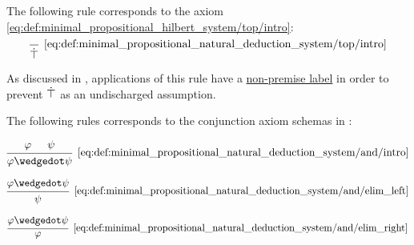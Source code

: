 \begin{definition}
\begin{thmenum}
     The following rule corresponds to the axiom \eqref{eq:def:minimal_propositional_hilbert_system/top/intro}:
    \begin{equation*}\taglabel[\( \top^+ \)]{eq:def:minimal_propositional_natural_deduction_system/top/intro}
      \begin{prooftree}
        \infer0[\ref{eq:def:minimal_propositional_natural_deduction_system/top/intro}]{ \syntop }
      \end{prooftree}
    \end{equation*}

    As discussed in , applications of this rule have a \hyperref[def:natural_deduction_proof_tree/premises]{non-premise label} in order to prevent \( \dot\top \) as an undischarged assumption.

     The following rules corresponds to the conjunction axiom schemas in :

    \begin{minipage}{0.3\textwidth}
      \begin{equation*}\taglabel[\( \wedge^+ \)]{eq:def:minimal_propositional_natural_deduction_system/and/intro}
        \begin{prooftree}
          \hypo{ \varphi }
          \hypo{ \psi }
          \infer2[\ref{eq:def:minimal_propositional_natural_deduction_system/and/intro}]{ \varphi \synwedge \psi }
        \end{prooftree}
      \end{equation*}
    \end{minipage}
    \hfill
    \begin{minipage}{0.3\textwidth}
      \begin{equation*}\taglabel[\( \wedge^{-_L} \)]{eq:def:minimal_propositional_natural_deduction_system/and/elim_left}
        \begin{prooftree}
          \hypo{ \varphi \synwedge \psi }
          \infer1[\ref{eq:def:minimal_propositional_natural_deduction_system/and/elim_left}]{ \psi }
        \end{prooftree}
      \end{equation*}
    \end{minipage}
    \hfill
    \begin{minipage}{0.3\textwidth}
      \begin{equation*}\taglabel[\( \wedge^{-_R} \)]{eq:def:minimal_propositional_natural_deduction_system/and/elim_right}
        \begin{prooftree}
          \hypo{ \varphi \synwedge \psi }
          \infer1[\ref{eq:def:minimal_propositional_natural_deduction_system/and/elim_right}]{ \varphi }
        \end{prooftree}
      \end{equation*}
    \end{minipage}


\end{thmenum}
\end{definition}
